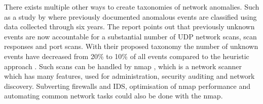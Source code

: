 There exists multiple other ways to create taxonomies of network anomalies.
Such as a study by \textcite{6906328} where previously documented anomalous events are classified using data collected through six years.
The report points out that previously unknown events are now accountable for a substantial number of UDP network scans, scan responses and port scans. With their proposed taxonomy the number of unknown events have decreased from 20\% to 10\% of all events compared to the heuristic approach \autocite{6906328}.
Such scans can be handled by nmap \autocite{pinkard2008nmap}, which is a network scanner which has many features, used for administration, security auditing and network discovery.
Subverting firewalls and IDS, optimisation of nmap performance and automating common network tasks could also be done with the nmap.